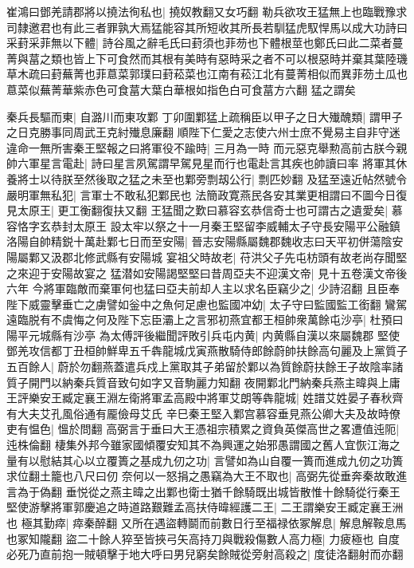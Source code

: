 崔鴻曰鄧羌請郡將以撓法徇私也|{
	撓奴教翻又女巧翻}
勒兵欲攻王猛無上也臨戰豫求司隸邀君也有此三者罪孰大焉猛能容其所短收其所長若馴猛虎馭悍馬以成大功詩曰采葑采菲無以下體|{
	詩谷風之辭毛氏曰葑須也菲芴也下體根莖也鄭氏曰此二菜者蔓菁與葍之類也皆上下可食然而其根有美時有惡時采之者不可以根惡時并棄其葉陸璣草木疏曰葑蕪菁也菲蒠菜郭璞曰葑菘菜也江南有菘江北有蔓菁相似而異菲芴土瓜也蒠菜似蕪菁華紫赤色可食葍大葉白華根如指色白可食葍方六翻}
猛之謂矣

秦兵長驅而東|{
	自潞川而東攻鄴}
丁卯圍鄴猛上疏稱臣以甲子之日大殱醜類|{
	謂甲子之日克勝事同周武王克紂殱息廉翻}
順陛下仁愛之志使六州士庶不覺易主自非守迷違命一無所害秦王堅報之曰將軍役不踰時|{
	三月為一時}
而元惡克舉勲高前古朕今親帥六軍星言電赴|{
	詩曰星言夙駕謂早駕見星而行也電赴言其疾也帥讀曰率}
將軍其休養將士以待朕至然後取之猛之未至也鄴旁剽刼公行|{
	剽匹妙翻}
及猛至遠近帖然號令嚴明軍無私犯|{
	言軍士不敢私犯鄴民也}
法簡政寛燕民各安其業更相謂曰不圖今日復見太原王|{
	更工衡翻復扶又翻}
王猛聞之歎曰慕容玄恭信奇士也可謂古之遺愛矣|{
	慕容恪字玄恭封太原王}
設太牢以祭之十一月秦王堅留李威輔太子守長安陽平公融鎮洛陽自帥精鋭十萬赴鄴七日而至安陽|{
	晉志安陽縣屬魏郡魏收志曰天平初併蕩陰安陽屬鄴又汲郡北修武縣有安陽城}
宴祖父時故老|{
	苻洪父子先屯枋頭有故老尚存聞堅之來迎于安陽故宴之}
猛潜如安陽謁堅堅曰昔周亞夫不迎漢文帝|{
	見十五卷漢文帝後六年}
今將軍臨敵而棄軍何也猛曰亞夫前却人主以求名臣竊少之|{
	少詩沼翻}
且臣奉陛下威靈擊垂亡之虜譬如釡中之魚何足慮也監國冲幼|{
	太子守曰監國監工銜翻}
鸞駕遠臨脱有不虞悔之何及陛下忘臣灞上之言邪初燕宜都王桓帥衆萬餘屯沙亭|{
	杜預曰陽平元城縣有沙亭}
為太傅評後繼聞評敗引兵屯内黄|{
	内黄縣自漢以來屬魏郡}
堅使鄧羌攻信都丁丑桓帥鮮卑五千犇龍城戊寅燕散騎侍郎餘蔚帥扶餘高句麗及上黨質子五百餘人|{
	蔚於勿翻燕蓋遣兵戍上黨取其子弟留於鄴以為質餘蔚扶餘王子故陰率諸質子開門以納秦兵質音致句如字又音駒麗力知翻}
夜開鄴北門納秦兵燕主暐與上庸王評樂安王臧定襄王淵左衛將軍孟高殿中將軍艾朗等犇龍城|{
	姓譜艾姓晏子春秋齊有大夫艾孔風俗通有龎儉母艾氏}
辛巳秦王堅入鄴宫慕容垂見燕公卿大夫及故時僚吏有愠色|{
	慍於問翻}
高弼言于垂曰大王憑祖宗積累之資負英傑高世之畧遭值迍阨|{
	迍株倫翻}
棲集外邦今雖家國傾覆安知其不為興運之始邪愚謂國之舊人宜恢江海之量有以慰結其心以立覆簣之基成九仞之功|{
	言譬如為山自覆一簣而進成九仞之功簣求位翻土籠也八尺曰仞}
奈何以一怒捐之愚竊為大王不取也|{
	高弼先從垂奔秦故敢進言為于偽翻}
垂悦從之燕主暐之出鄴也衛士猶千餘騎既出城皆散惟十餘騎從行秦王堅使游擊將軍郭慶追之時道路艱難孟高扶侍暐經護二王|{
	二王謂樂安王臧定襄王洲也}
極其勤瘁|{
	瘁秦醉翻}
又所在遇盜轉鬬而前數日行至福禄依冢解息|{
	解息解鞍息馬也冢知隴翻}
盜二十餘人猝至皆挾弓矢高持刀與戰殺傷數人高力極|{
	力疲極也}
自度必死乃直前抱一賊頓擊于地大呼曰男兒窮矣餘賊從旁射高殺之|{
	度徒洛翻射而亦翻}
